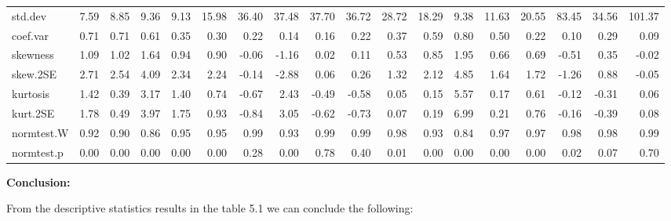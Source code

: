 \documentclass[12pt,openany]{book}
\begin{document}
\begin{longtable}{lrrrrrrrrrrrrrrrrr}
\rowcolor{gray!6}  std.dev & 7.59 & 8.85 & 9.36 & 9.13 & 15.98 & 36.40 & 37.48 & 37.70 & 36.72 & 28.72 & 18.29 & 9.38 & 11.63 & 20.55 & 83.45 & 34.56 & 101.37\\
coef.var & 0.71 & 0.71 & 0.61 & 0.35 & 0.30 & 0.22 & 0.14 & 0.16 & 0.22 & 0.37 & 0.59 & 0.80 & 0.50 & 0.22 & 0.10 & 0.29 & 0.09\\
\rowcolor{gray!6}  skewness & 1.09 & 1.02 & 1.64 & 0.94 & 0.90 & -0.06 & -1.16 & 0.02 & 0.11 & 0.53 & 0.85 & 1.95 & 0.66 & 0.69 & -0.51 & 0.35 & -0.02\\
\addlinespace
skew.2SE & 2.71 & 2.54 & 4.09 & 2.34 & 2.24 & -0.14 & -2.88 & 0.06 & 0.26 & 1.32 & 2.12 & 4.85 & 1.64 & 1.72 & -1.26 & 0.88 & -0.05\\
\rowcolor{gray!6}  kurtosis & 1.42 & 0.39 & 3.17 & 1.40 & 0.74 & -0.67 & 2.43 & -0.49 & -0.58 & 0.05 & 0.15 & 5.57 & 0.17 & 0.61 & -0.12 & -0.31 & 0.06\\
kurt.2SE & 1.78 & 0.49 & 3.97 & 1.75 & 0.93 & -0.84 & 3.05 & -0.62 & -0.73 & 0.07 & 0.19 & 6.99 & 0.21 & 0.76 & -0.16 & -0.39 & 0.08\\
\rowcolor{gray!6}  normtest.W & 0.92 & 0.90 & 0.86 & 0.95 & 0.95 & 0.99 & 0.93 & 0.99 & 0.99 & 0.98 & 0.93 & 0.84 & 0.97 & 0.97 & 0.98 & 0.98 & 0.99\\
normtest.p & 0.00 & 0.00 & 0.00 & 0.00 & 0.00 & 0.28 & 0.00 & 0.78 & 0.40 & 0.01 & 0.00 & 0.00 & 0.00 & 0.00 & 0.02 & 0.07 & 0.70\\
\bottomrule
\end{longtable}
\endgroup{}

\textbf{Conclusion:}

From the descriptive statistics results in the table 5.1 we can conclude the following:
\end{document}
